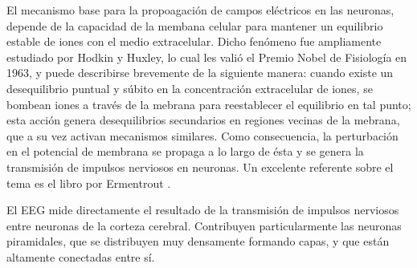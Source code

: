 


El mecanismo base para la propoagación de campos eléctricos en las neuronas, 
depende de la capacidad de la membana celular para mantener un equilibrio estable de iones con 
el medio extracelular.
Dicho fenómeno fue ampliamente estudiado por Hodkin y Huxley, lo cual les valió el
Premio Nobel de Fisiología en 1963, y puede describirse brevemente de la siguiente manera:
cuando existe un desequilibrio puntual y súbito en la concentración extracelular de iones, se 
bombean iones a través de la mebrana para reestablecer el equilibrio en tal punto; esta acción 
genera desequilibrios secundarios en regiones vecinas de la mebrana, que a su vez activan mecanismos 
similares. Como consecuencia, la perturbación en el potencial de membrana se propaga 
a lo largo de ésta y se genera la transmisión de impulsos nerviosos en neuronas.
Un excelente referente sobre el tema es el libro por Ermentrout \cite{Ermentrout10}.

El EEG mide directamente el resultado de la transmisión de impulsos nerviosos entre neuronas de la
corteza cerebral. Contribuyen particularmente las neuronas piramidales, que se distribuyen muy densamente
formando capas, y que están altamente conectadas entre sí.


